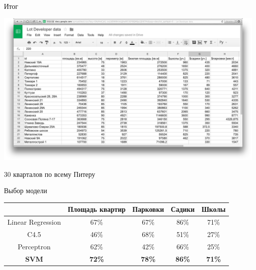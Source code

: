 \documentclass[14pt, fleqn, xcolor={dvipsnames, table}]{beamer}
\begin{document}
        \begin{frame}{Итог}
            \begin{center}
                \includegraphics[scale=0.20]{data.png}
                
                30 кварталов по всему Питеру
            \end{center} 
        \end{frame}
        
        
        
        \begin{frame}{Выбор модели}
            \begin{footnotesize}
            
            
            \begin{table} 
		        \begin{tabular} {| c | c | c | c | c |}
				    \hline
				        &    Площадь квартир   &    Парковки    &    Садики    &    Школы   \\
				    \hline
				    Linear Regression    &    67\%    &    67\%    &    86\%    &    71\%    \\		
				    C4.5    &    46\%    &    68\%    &    51\%    &    27\%    \\
				    Perceptron    &    62\%    &    42\%    &   66\%    &    25\%    \\
				    \bf{SVM}    &    \bf{72\%}    &    \bf{78\%}    &   \bf{86\%}    &    \bf{71\%}    \\
				    \hline
			    \end{tabular}
		    \end{table}  
		    
		    
            \end{footnotesize}
        \end{frame}
        
\end{document}
